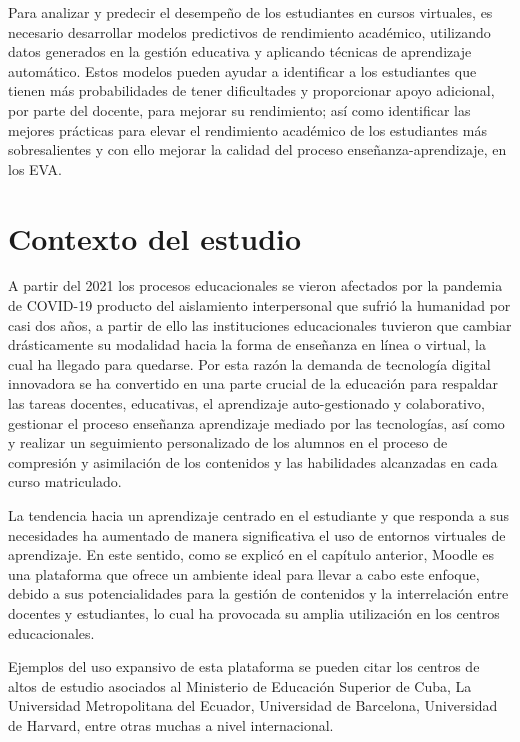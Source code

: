  
Para analizar y predecir el desempeño de los estudiantes en cursos virtuales, es necesario desarrollar modelos predictivos de rendimiento académico, utilizando datos generados en la gestión educativa y aplicando técnicas de aprendizaje automático. Estos modelos pueden ayudar a identificar a los estudiantes que tienen más probabilidades de tener dificultades y proporcionar apoyo adicional, por parte del docente, para mejorar su rendimiento; así como identificar las mejores prácticas para elevar el rendimiento académico de los estudiantes más sobresalientes y con ello mejorar la calidad del proceso enseñanza-aprendizaje, en los EVA.  


\section{Contexto del estudio}

A partir del 2021 los procesos educacionales se vieron afectados por la pandemia de COVID-19 producto del aislamiento interpersonal que sufrió la humanidad por casi dos años, a partir de ello las instituciones educacionales tuvieron que cambiar drásticamente su modalidad hacia la forma de enseñanza en línea o virtual, la cual ha llegado para quedarse. Por esta razón la demanda de tecnología digital innovadora se ha convertido en una parte crucial de la educación para respaldar las tareas docentes, educativas, el aprendizaje auto-gestionado y colaborativo, gestionar el proceso enseñanza aprendizaje mediado por las tecnologías, así como y  realizar un seguimiento personalizado de los alumnos en el proceso de compresión y asimilación de los contenidos y las habilidades alcanzadas en  cada curso matriculado.  


La tendencia hacia un aprendizaje centrado en el estudiante y que responda a sus necesidades ha aumentado de manera significativa el uso de entornos virtuales de aprendizaje. En este sentido, como se explicó en el capítulo anterior, Moodle es una plataforma que ofrece un ambiente ideal para llevar a cabo este enfoque, debido a sus potencialidades para la gestión de contenidos y la interrelación entre docentes y estudiantes, lo cual ha provocada su amplia utilización en los centros educacionales.  


Ejemplos del uso expansivo de esta plataforma se pueden citar los centros de altos de estudio asociados al Ministerio de Educación Superior de Cuba, La Universidad Metropolitana del Ecuador, Universidad de Barcelona,  Universidad de Harvard, entre otras muchas a nivel internacional.   


